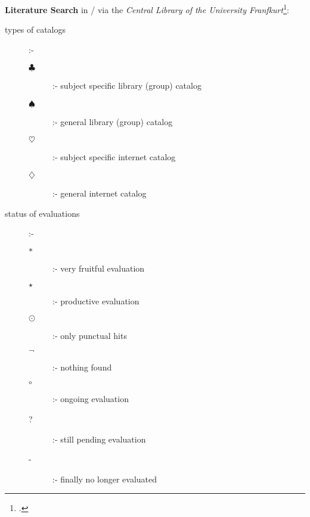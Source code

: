 \documentclass[
  DIV=calc,
  BCOR=5mm,
  11pt,
  headings=small,
  oneside,
  abstract=true,
  toc=bib,
  ngerman,english]{scrartcl}
\newcommand{\TopicalLibraryCatalog}{$\clubsuit$}
\newcommand{\TopicalLibraryCatalogDefinition}{subject specific library (group) catalog}
\newcommand{\GeneralLibraryCatalog}{$\spadesuit$}
\newcommand{\GeneralLibraryCatalogDefinition}{general library (group) catalog}
\newcommand{\TopicalInternetCatalog}{$\heartsuit$}
\newcommand{\TopicalInternetCatalogDefinition}{subject specific internet catalog}
\newcommand{\GeneralInternetCatalog}{$\diamondsuit$}
\newcommand{\GeneralInternetCatalogDefinition}{general internet catalog}
\newcommand{\many}{$\ast$}
\newcommand{\manyDef}{very fruitful evaluation}
\newcommand{\some}{$\star$}
\newcommand{\someDef}{productive evaluation}
\newcommand{\few}{$\odot$}
\newcommand{\fewDef}{only punctual hits}
\newcommand{\nothing}{$\neg$}
\newcommand{\nothingDef}{nothing found}
\newcommand{\ongoing}{$\circ$}
\newcommand{\ongoingDef}{ongoing evaluation}
\newcommand{\open}{?}
\newcommand{\openDef}{still pending evaluation}
\newcommand{\ignored}{-}
\newcommand{\ignoredDef}{finally no longer evaluated}
\begin{document}
\textbf{Literature Search} in / via the
\emph{Central Library of the University Franfkurt}\footcite[s.][n.P.]{UbFam2018a}:


\begin{description}
  \item[types of catalogs] :-
    \begin{description}
      \item[\TopicalLibraryCatalog] :- \TopicalLibraryCatalogDefinition
      \item[\GeneralLibraryCatalog] :- \GeneralLibraryCatalogDefinition
      \item[\TopicalInternetCatalog] :- \TopicalInternetCatalogDefinition
      \item[\GeneralInternetCatalog] :- \GeneralInternetCatalogDefinition
    \end{description}
  \item[status of evaluations] :-
    \begin{description}
      \item[\many] :- \manyDef
      \item[\some] :- \someDef
      \item[\few] :- \fewDef
      \item[\nothing] :- \nothingDef
      \item[\ongoing] :- \ongoingDef
      \item[\open] :- \openDef
      \item[\ignored] :- \ignoredDef
    \end{description}
\end{description}



\end{document}
